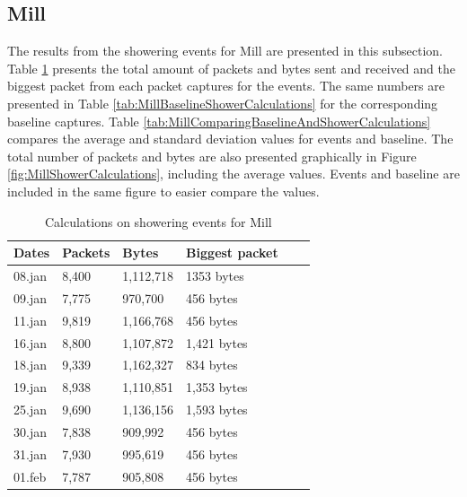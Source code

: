 \newpage
\subsection{Mill}
The results from the showering events for Mill are presented in this subsection. Table \ref{tab:MillShowerCalculations} presents the total amount of packets and bytes sent and received and the biggest packet from each packet captures for the events. The same numbers are presented in Table \ref{tab:MillBaselineShowerCalculations} for the corresponding baseline captures. Table \ref{tab:MillComparingBaselineAndShowerCalculations} compares the average and standard deviation values for events and baseline. The total number of packets and bytes are also presented graphically in Figure \ref{fig:MillShowerCalculations}, including the average values. Events and baseline are included in the same figure to easier compare the values. 

\begin{table}[H]
    \centering
    \caption{Calculations on showering events for Mill}
    \begin{tabular}{|l|l|l|l|l|l|}
    \hline
        \textbf{Dates} & \textbf{Packets} & \textbf{Bytes} & \textbf{Biggest packet} \\ \hline
        08.jan & 8,400 & 1,112,718 & 1353 bytes   \\ \hline
        09.jan & 7,775 & 970,700   & 456 bytes   \\ \hline
        11.jan & 9,819 & 1,166,768 & 456 bytes   \\ \hline
        16.jan & 8,800 & 1,107,872 & 1,421 bytes \\ \hline
        18.jan & 9,339 & 1,162,327 & 834 bytes   \\ \hline
        19.jan & 8,938 & 1,110,851 & 1,353 bytes \\ \hline
        25.jan & 9,690 & 1,136,156 & 1,593 bytes \\ \hline
        30.jan & 7,838 & 909,992   & 456 bytes  \\ \hline
        31.jan & 7,930 & 995,619   & 456 bytes \\ \hline
        01.feb & 7,787 & 905,808   & 456 bytes \\ \hline
    \end{tabular}
    \label{tab:MillShowerCalculations}
\end{table}

